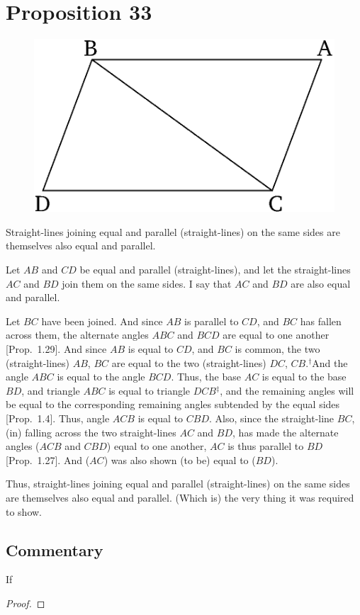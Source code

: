 \chapter*{Proposition 33}



\begin{figure}[ht]
    \begin{center}
    \includegraphics[width=0.5\linewidth]{figures/fig33e.eps}
    \label{fig:prop_33}
    \end{center}
\end{figure}

Straight-lines joining equal and parallel (straight-lines) on the same sides
are themselves also equal and parallel.

Let $AB$ and $CD$ be equal and parallel (straight-lines), and let the
straight-lines $AC$ and $BD$ join them on the same sides. I say that $AC$
and $BD$ are also equal and parallel.

Let $BC$ have been joined. And since $AB$ is parallel to $CD$, and $BC$ has
fallen across them, the alternate angles $ABC$ and $BCD$ are equal to one another [Prop.~1.29]. And since $AB$ is equal to $CD$, and $BC$ is common,
the two (straight-lines) $AB$, $BC$ are equal to the two (straight-lines)
$DC$, $CB$.$^\dag$And the angle $ABC$ is equal to the angle $BCD$. Thus, the
base $AC$ is equal to the base $BD$, and triangle $ABC$ is equal to triangle
$DCB$$^\ddag$, and the remaining angles will be equal to the corresponding remaining
angles subtended by the equal sides [Prop.~1.4]. Thus,  angle $ACB$ 
is equal to $CBD$. Also, since the straight-line $BC$, (in) falling across the two
straight-lines $AC$ and $BD$, has made the alternate angles  ($ACB$ and $CBD$) equal to one another,
$AC$ is thus parallel to $BD$ [Prop.~1.27]. And ($AC$) was also shown (to be) equal
to ($BD$).

Thus, straight-lines joining equal and parallel (straight-lines) on the same sides
are  themselves also equal and parallel. (Which is) the very thing it was
required to show.


\section*{Commentary}

\begin{proposition}\label{proposition_33}\leanok
    If
\end{proposition}
\begin{proof}
    \leanok
\end{proof}
